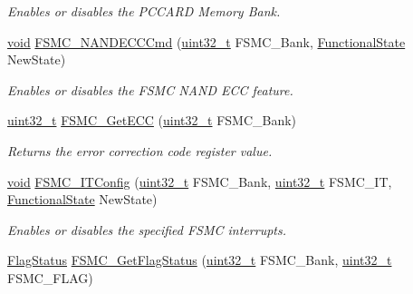 \begin{DoxyCompactItemize}
\begin{DoxyCompactList}\small\item\em Enables or disables the P\+C\+C\+A\+RD Memory Bank. \end{DoxyCompactList}\item 
\hyperlink{usb__devapi_8h_afabf60e7f57651d6d595a02c75f07cd0}{void} \hyperlink{group___f_s_m_c___private___functions_ga5800301fc39bbe998a18ebd9ff191cdc}{F\+S\+M\+C\+\_\+\+N\+A\+N\+D\+E\+C\+C\+Cmd} (\hyperlink{_p_e___types_8h_a33594304e786b158f3fb30289278f5af}{uint32\+\_\+t} F\+S\+M\+C\+\_\+\+Bank, \hyperlink{agilefox_2library_2inc_2stm32f10x__type_8h_ac9a7e9a35d2513ec15c3b537aaa4fba1}{Functional\+State} New\+State)
\begin{DoxyCompactList}\small\item\em Enables or disables the F\+S\+MC N\+A\+ND E\+CC feature. \end{DoxyCompactList}\item 
\hyperlink{_p_e___types_8h_a33594304e786b158f3fb30289278f5af}{uint32\+\_\+t} \hyperlink{group___f_s_m_c___private___functions_gaad6d4f5b5a41684ce053fea55bdb98d8}{F\+S\+M\+C\+\_\+\+Get\+E\+CC} (\hyperlink{_p_e___types_8h_a33594304e786b158f3fb30289278f5af}{uint32\+\_\+t} F\+S\+M\+C\+\_\+\+Bank)
\begin{DoxyCompactList}\small\item\em Returns the error correction code register value. \end{DoxyCompactList}\item 
\hyperlink{usb__devapi_8h_afabf60e7f57651d6d595a02c75f07cd0}{void} \hyperlink{group___f_s_m_c___private___functions_ga217027ae3cd213b9076b6a1be197064c}{F\+S\+M\+C\+\_\+\+I\+T\+Config} (\hyperlink{_p_e___types_8h_a33594304e786b158f3fb30289278f5af}{uint32\+\_\+t} F\+S\+M\+C\+\_\+\+Bank, \hyperlink{_p_e___types_8h_a33594304e786b158f3fb30289278f5af}{uint32\+\_\+t} F\+S\+M\+C\+\_\+\+IT, \hyperlink{agilefox_2library_2inc_2stm32f10x__type_8h_ac9a7e9a35d2513ec15c3b537aaa4fba1}{Functional\+State} New\+State)
\begin{DoxyCompactList}\small\item\em Enables or disables the specified F\+S\+MC interrupts. \end{DoxyCompactList}\item 
\hyperlink{agilefox_2library_2inc_2stm32f10x__type_8h_a89136caac2e14c55151f527ac02daaff}{Flag\+Status} \hyperlink{group___f_s_m_c___private___functions_gae00355115b078f483f0771057bb849c4}{F\+S\+M\+C\+\_\+\+Get\+Flag\+Status} (\hyperlink{_p_e___types_8h_a33594304e786b158f3fb30289278f5af}{uint32\+\_\+t} F\+S\+M\+C\+\_\+\+Bank, \hyperlink{_p_e___types_8h_a33594304e786b158f3fb30289278f5af}{uint32\+\_\+t} F\+S\+M\+C\+\_\+\+F\+L\+AG)

\end{DoxyCompactItemize}
